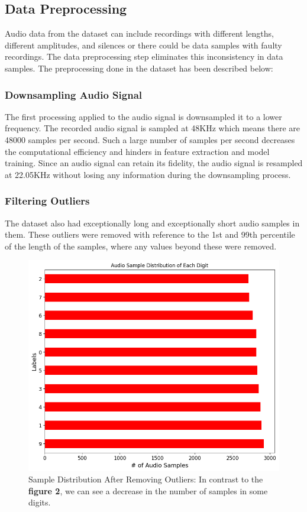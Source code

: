 \documentclass[12pt]{article}
\begin{document}
\subsection{Data Preprocessing}
Audio data from the dataset can include recordings with different lengths, different amplitudes, and silences or there could be data samples with faulty recordings. The data preprocessing step eliminates this inconsistency in data samples. The preprocessing done in the dataset has been described below:

\subsubsection{Downsampling Audio Signal}
The first processing applied to the audio signal is downsampled it to a lower frequency. The recorded audio signal is sampled at 48KHz which means there are 48000 samples per second. Such a large number of samples per second decreases the computational efficiency and hinders in feature extraction and model training. Since an audio signal can retain its fidelity, the audio signal is resampled at 22.05KHz without losing any information during the downsampling process.

\subsubsection{Filtering Outliers}
The dataset also had exceptionally long and exceptionally short audio samples in them. These outliers were removed with reference to the 1st and 99th percentile of the length of the samples, where any values beyond these were removed.

\begin{figure}[!h]
    \centering
    \includegraphics[width=0.5\linewidth]{figures/audio after filtering data.png}
    \caption{Sample Distribution After Removing Outliers: In contrast to the \textbf{figure 2},  we can see a decrease in the number of samples in some digits.}
    \label{fig:enter-label}
\end{figure}
\end{document}
